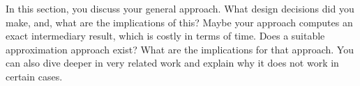 In this section, you discuss your general approach.
What design decisions did you make, and, what are the implications of this?
Maybe your approach computes an exact intermediary result, which is costly in terms of time.
Does a suitable approximation approach exist?
What are the implications for that approach.
You can also dive deeper in very related work and explain why it does not work in certain cases.